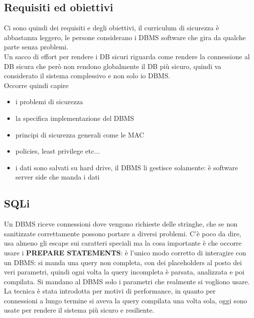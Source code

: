 \documentclass[12pt, oneside]{extbook} %
\begin{document}
\subsection{Requisiti ed obiettivi}
Ci sono quindi dei requisiti e degli obiettivi, il curriculum di sicurezza è abbastanza leggero, le persone considerano i DBMS software che gira da qualche parte senza problemi.\\Un sacco di effort per rendere i DB sicuri riguarda come rendere la connessione al DB sicura che però non rendono globalmente il DB più sicuro, quindi va considerato il sistema complessivo e non solo io DBMS.\\Occorre quindi capire 
\begin{itemize}
	\item i problemi di sicurezza
	\item la specifica implementazione del DBMS
	\item principi di sicurezza generali come le MAC
	\item policies, least privilege etc...
	\item i dati sono salvati su hard drive, il DBMS li gestisce solamente: è software server side che manda i dati
\end{itemize}
\subsection{SQLi}
Un DBMS riceve connessioni dove vengono richieste delle stringhe, che se non sanitizzate correttamente possono portare a diversi problemi. C'è poco da dire, usa almeno gli escape sui caratteri speciali ma la cosa importante è che occorre usare i \textbf{PREPARE STATEMENTS}: è l'unico modo corretto di interagire con un DBMS: si manda una query non completa, con dei placeholders al posto dei veri parametri, quindi ogni volta la query incompleta è parsata, analizzata e poi compilata. Si mandano al DBMS solo i parametri che realmente si vogliono usare. La tecnica è stata introdotta per motivi di performance, in quanto per connessioni a lungo termine si aveva la query compilata una volta sola, oggi sono usate per rendere il sistema più sicuro e resiliente.
\end{document}
